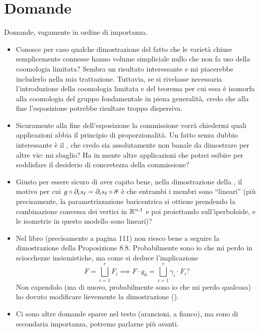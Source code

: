 \section*{Domande}
Domande, vagamente in ordine di importanza.
\begin{itemize}
\item Conosce per caso qualche dimostrazione del fatto che le varietà chiuse semplicemente connesse hanno volume simpliciale nullo che non fa uso della coomologia limitata? Sembra un risultato interessante e mi piacerebbe includerlo nella mia trattazione. Tuttavia, se si rivelasse necessaria l'introduzione della coomologia limitata e del teorema per cui essa è isomorfa alla coomologia del gruppo fondamentale in piena generalità, credo che alla fine l'esposizione potrebbe risultare troppo dispersiva.
\item Sicuramente alla fine dell'esposizione la commissione vorrà chiedermi quali applicazioni abbia il principio di proporzionalità. Un fatto senza dubbio interessante è il , che credo sia assolutamente non banale da dimostrare per altre vie: mi sbaglio? Ha in mente altre applicazioni che potrei esibire per soddisfare il desiderio di concretezza della commissione?
\item Giusto per essere sicuro di aver capito bene, nella dimostrazione della , il motivo per cui $g\circ\partial_is_\ell=\partial_is_\ell\circ\overline{\sigma}$ è che entrambi i membri sono ``lineari'' (più precisamente, la parametrizzazione baricentrica si ottiene prendendo la combinazione convessa dei vertici in $\mathbb{R}^{n,1}$ e poi proiettando sull'iperboloide, e le isometrie in questo modello sono lineari)?
\item Nel libro (precisamente a pagina 111) non riesco bene a seguire la dimostrazione della Proposizione 8.8. Probabilmente sono io che mi perdo in sciocchezze insiemistiche, ma come si deduce l'implicazione
\[
F=\bigsqcup_{i=1}^r F_i\implies F\cdot g_0=\bigsqcup_{i=1}^r \gamma_i\cdot F_i?
\]
Non capendolo (ma di nuovo, probabilmente sono io che mi perdo qualcosa) ho dovuto modificare lievemente la dimostrazione ().
\item Ci sono altre domande sparse nel testo (arancioni, a fianco), ma sono di secondaria importanza, potremo parlarne più avanti.
\end{itemize}